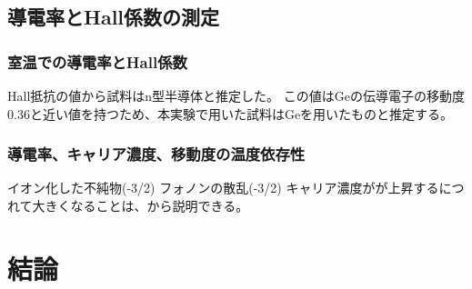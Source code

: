 \documentclass[11pt,a4]{jarticle}
\begin{document}
\subsection{導電率とHall係数の測定}
\subsubsection{室温での導電率とHall係数}
Hall抵抗の値から試料はn型半導体と推定した。
この値はGeの伝導電子の移動度0.36と近い値を持つため、本実験で用いた試料はGeを用いたものと推定する。
\subsubsection{導電率、キャリア濃度、移動度の温度依存性}
イオン化した不純物(-3/2)
フォノンの散乱(-3/2)
キャリア濃度がが上昇するにつれて大きくなることは、から説明できる。

\section{結論}
\end{document}
